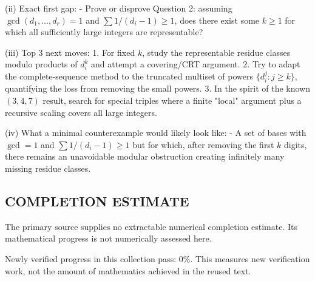 (ii) Exact first gap:
- Prove or disprove Question 2: assuming $\gcd(d_1,\dots,d_r)=1$ and $\sum 1/(d_i-1)\ge 1$, does there exist some $k\ge 1$ for which all sufficiently large integers are representable?

(iii) Top 3 next moves:
1. For fixed $k$, study the representable residue classes modulo products of $d_i^k$ and attempt a covering/CRT argument.
2. Try to adapt the complete-sequence method to the truncated multiset of powers $\{d_i^j:j\ge k\}$, quantifying the loss from removing the small powers.
3. In the spirit of the known $(3,4,7)$ result, search for special triples where a finite "local" argument plus a recursive scaling covers all large integers.

(iv) What a minimal counterexample would likely look like:
- A set of bases with $\gcd=1$ and $\sum 1/(d_i-1)\ge 1$ but for which, after removing the first $k$ digits, there remains an unavoidable modular obstruction creating infinitely many missing residue classes.




\subsection*{COMPLETION ESTIMATE}
The primary source supplies no extractable numerical completion estimate. Its mathematical progress is not numerically assessed here.

Newly verified progress in this collection pass: $0\%$. This measures new verification work, not the amount of mathematics achieved in the reused text.
